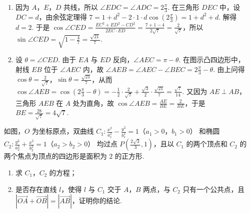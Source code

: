 \begin{solution}
\begin{enumerate}
\item 因为 \(A\)，\(E\)，\(D\) 共线，所以 \(\angle EDC=\angle ADC=2\frac{\pi}{3}\). 在三角形 \(DEC\) 中，设 \(DC=d\)，由余弦定理得 \(7=1+d^2-2\cdot1\cdot d\cos(2\frac{\pi}{3})=1+d^2+d\). 解得 \(d=2\). 于是 \(\cos\angle CED=\frac{EC^2+ED^2-CD^2}{2EC\cdot ED}=\frac{7+1-4}{2\sqrt7}=\frac{2}{\sqrt7}\)，所以 \(\sin\angle CED=\sqrt{1-\frac{4}{7}}=\frac{\sqrt{21}}{7}\).
\item 设 \(\theta=\angle CED\). 由于 \(EA\) 与 \(ED\) 反向，\(\angle AEC=\pi-\theta\). 在图示凸四边形中，射线 \(EB\) 位于 \(\angle AEC\) 内，故 \(\angle AEB=\angle AEC-\angle BEC=2\frac{\pi}{3}-\theta\). 由上问得 \(\cos\theta=\frac{2}{\sqrt7}\)，\(\sin\theta=\frac{\sqrt{21}}{7}\)，从而 \(\cos\angle AEB=\cos(2\frac{\pi}{3}-\theta)=-\frac12\cdot\frac{2}{\sqrt7}+\frac{\sqrt3}{2}\cdot\frac{\sqrt{21}}7=\frac{\sqrt7}{14}\). 又因为 \(AE\perp AB\)，三角形 \(AEB\) 在 \(A\) 处为直角，故 \(\cos\angle AEB=\frac{AE}{BE}=\frac{2}{BE}\)，于是 \(BE=\frac{28}{\sqrt7}=4\sqrt7\).
\end{enumerate}
\end{solution}

\begin{problem}
如图，\(O\) 为坐标原点，双曲线 \(C_{1}:\frac{x^{2}}{a_{1}^{2}} - \frac{y^{2}}{b_{1}^{2}} = 1\)（\(a_{1} > 0\)，\(b_{1} > 0\)） 和椭圆 \(C_{2}:\frac{y^{2}}{a_{2}^{2}} + \frac{x^{2}}{b_{2}^{2}} = 1\)（\(a_{2} > b_{2} > 0\)） 均过点 \(P\left(\frac{2\sqrt{3}}{3},1\right)\)，且以 \(C_{1}\) 的两个顶点和 \(C_{2}\) 的两个焦点为顶点的四边形是面积为 \(2\) 的正方形.

\begin{enumerate}
\item 求 \(C_1\)，\(C_2\) 的方程；
\item 是否存在直线 \(l\)，使得 \(l\) 与 \(C_1\) 交于 \(A\)，\(B\) 两点，与 \(C_2\) 只有一个公共点，且 \(\left|\overrightarrow{OA} + \overrightarrow{OB}\right| = \left|\overrightarrow{AB}\right|\)，证明你的结论.
\end{enumerate}

\end{problem}


